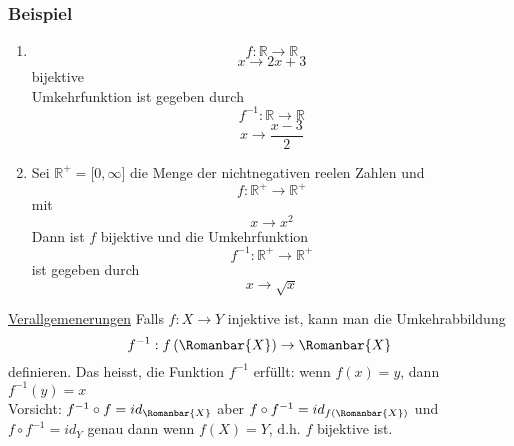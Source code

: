 \subsubsection*{Beispiel}
\begin{enumerate}
\item \[f:\mathbb{R}\rightarrow\mathbb{R}\]\[x\rightarrow 2x+3\] bijektive\\
Umkehrfunktion ist gegeben durch \[f^{-1}:\mathbb{R}\rightarrow\mathbb{R}\]\[x\rightarrow\frac{x-3}{2}\]
\item Sei $\mathbb{R}^+=\lbrack 0,\infty\rbrack$ die Menge der nichtnegativen reelen Zahlen und \[f:\mathbb{R}^+\rightarrow\mathbb{R}^+\] mit \[x\rightarrow x^2\]
Dann ist $f$ bijektive und die Umkehrfunktion \[f^{-1}:\mathbb{R}^+\rightarrow\mathbb{R}^+\] ist gegeben durch \[x\rightarrow\sqrt{x}\]
\end{enumerate}

\underline{Verallgemenerungen}
Falls $f:X\rightarrow Y$ injektive ist, kann man die Umkehrabbildung \[f^{-1}:f\left(\Romanbar{X}\right)\rightarrow\Romanbar{X}\] definieren. Das heisst, die Funktion $f^{-1}$ erfüllt: wenn $f(x)=y$, dann $f^{-1}(y)=x$\\

\noindent Vorsicht: $f^{-1}\circ f=id_{\Romanbar{X}}$ aber $f\circ f^{-1}=id_{f\left(\Romanbar{X}\right)}$ und $f\circ f^{-1}=id_Y$ genau dann wenn $f(X)=Y$, d.h. $f$ bijektive ist.
